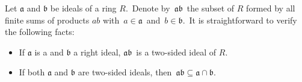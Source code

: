 \documentclass[12pt]{article}
\theoremstyle{definition}
\begin{document}
Let $\mathfrak{a}$ and $\mathfrak{b}$ be ideals of a ring $R$.\, Denote by\, $\mathfrak{ab}$\, the subset of $R$ formed by all finite sums of products $ab$ with\, $a \in \mathfrak{a}$\, and\, 
$b \in \mathfrak{b}$.\, It is straightforward to verify the following facts:
\begin{itemize}
\item If $\mathfrak{a}$ is a  and $\mathfrak{b}$ a right ideal, $\mathfrak{ab}$\, is a two-sided ideal of $R$.
\item If both $\mathfrak{a}$ and $\mathfrak{b}$ are two-sided ideals, then\,
 $\mathfrak{ab} \subseteq \mathfrak{a}\cap\mathfrak{b}$.
\end{itemize}
\end{document}
